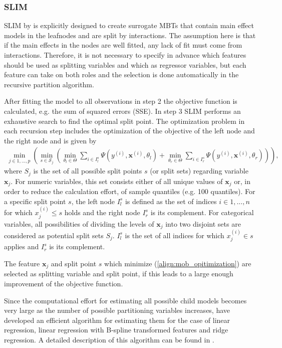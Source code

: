 \subsubsection{SLIM}
SLIM by \citet{Hu.2020} is explicitly designed to create surrogate MBTs that contain main effect models in the leafnodes and are split by interactions.  The assumption here is that if the main effects in the nodes are well fitted, any lack of fit must come from interactions. Therefore, it is not necessary to specify in advance which features should be used as splitting variables and which as regressor variables, but each feature can take on both roles and the selection is done automatically in the recursive partition algorithm. 

After fitting the model to all observations in step 2 the  objective function is calculated, e.g. the sum of squared errors (SSE).
In step 3 SLIM performs an exhaustive search to find the optimal split point.  
The optimization problem in each recursion step includes the optimization of the objective of the left node and the right node and is given by \begin{align} \label{align:mob_opitimization}
    \min_{j \in 1,..., p} \left( \min_{s \in \mathcal{S}_j} \left(\min_{\theta_{l} \in \Theta}\sum_{i \in I_{l}^s}\Psi(y^{(i)}, \mathbf{x}^{(i)}, \theta_{l})  +  \min_{\theta_{r} \in \Theta}\sum_{i \in I_{r}^s}\Psi(y^{(i)}, \mathbf{x}^{(i)}, \theta_{r}) \right) \right),
\end{align}
where ${S}_j$ is the set of all possible split points $s$ (or split sets) regarding variable $\mathbf{x}_j$. For numeric variables, this set consists either of all unique values of $\mathbf{x}_j$ or, in order to reduce the calculation effort, of sample quantiles (e.g. 100 quantiles). For a specific split point $s$, the left node $I_{l}^s$ is defined as the set of indices $i \in 1,...,n$ for which $x_j^{(i)} \leq s$ holds and the right node $I_{r}^s$ is its complement. For categorical variables, all possibilities of dividing the levels of $\mathbf{x}_j$ into two disjoint sets are considered as potential split sets $S_j$. $I_l^s$ is  the set of all indices for which $x_j^{(i)} \in s$ applies and $I_{r}^s$ is its complement.

The feature $\mathbf{x}_j$ and split point $s$ which minimize  (\ref{align:mob_opitimization}) are selected as splitting variable and split point, if this leads to a large enough improvement of the objective function.

Since the computational effort for estimating all possible child models becomes very large as the number of possible partitioning variables increases, \citet{Hu.2020} have developed an efficient algorithm for estimating them for the case of linear regression, linear regression with B-spline transformed features and ridge regression. A detailed description of this algorithm can be found in \citet{Hu.2020}.

